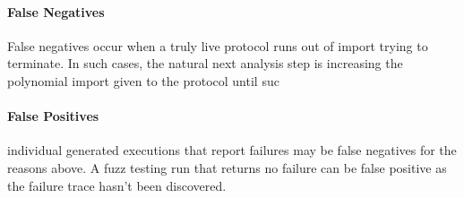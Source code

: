 \paragraph{False Negatives}
False negatives occur when a truly live protocol runs out of import trying to terminate. 
In such cases, the natural next analysis step is increasing the polynomial import given
to the protocol until suc 

\paragraph{False Positives}
individual generated executions that report failures may be false negatives for the reasons above.
A fuzz testing run that returns no failure can be false positive as the failure trace hasn't been discovered. 

